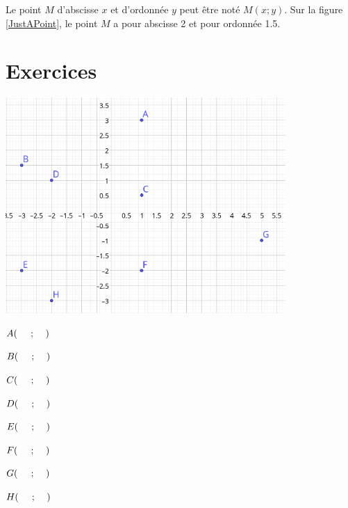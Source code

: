\documentclass[a4paper,12pt]{scrartcl}
\begin{document}
Le point $M$ d'abscisse $x$ et d'ordonnée $y$ peut être noté $M(x;y)$. Sur la figure \ref{JustAPoint}, le point $M$ a pour abscisse 2 et pour ordonnée 1.5. 

\section*{Exercices}


\begin{center}
\includegraphics[width=0.8\textwidth]{pics/QuelquesPoints.png}
\end{center}

\begin{multicols}{2}
$A(\hspace{5mm};\hspace{4mm})$

\vspace{4mm}
$B(\hspace{5mm};\hspace{4mm})$

\vspace{4mm}
$C(\hspace{5mm};\hspace{4mm})$

\vspace{4mm}
$D(\hspace{5mm};\hspace{4mm})$

\vspace{4mm}
$E(\hspace{5mm};\hspace{4mm})$

\vspace{4mm}
$F(\hspace{5mm};\hspace{4mm})$

\vspace{4mm}
$G(\hspace{5mm};\hspace{4mm})$

\vspace{4mm}
$H(\hspace{5mm};\hspace{4mm})$
\end{multicols}
\end{document}
